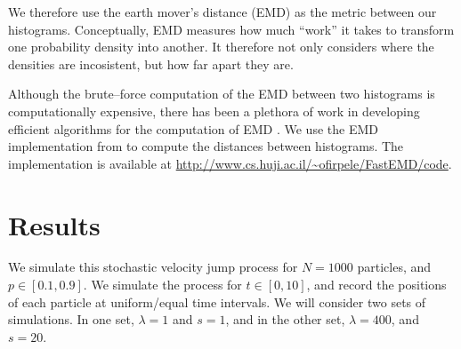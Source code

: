\documentclass[prl,reprint]{revtex4-1}
\begin{document}
We therefore use the earth mover's distance (EMD) \cite{rubner2000earth} as the metric between our histograms.
%
Conceptually, EMD measures how much ``work'' it takes to transform one probability density into another.
%
It therefore not only considers where the densities are incosistent, but how far apart they are.

Although the brute--force computation of the EMD between two histograms is computationally expensive, there has been a plethora of work in developing efficient algorithms for the computation of EMD \cite{...}.
%
%
We use the EMD implementation from \cite{Pele-eccv2008, Pele-iccv2009} to compute the distances between histograms.
%
The implementation is available at \url{http://www.cs.huji.ac.il/~ofirpele/FastEMD/code}. 

\section{Results}

We simulate this stochastic velocity jump process for $N=1000$ particles, and $p \in [0.1, 0.9]$.
%
We simulate the process for $t \in [0, 10]$, and record the positions of each particle at uniform/equal time intervals.
%
We will consider two sets of simulations.
%
In one set, $\lambda = 1$ and $s=1$, and in the other set, $\lambda = 400$, and $s=20$.
\end{document}
